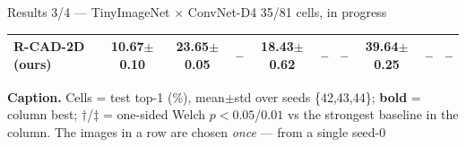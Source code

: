 \documentclass[aspectratio=169]{beamer}
\begin{document}
\begin{frame}{Results 3/4 --- TinyImageNet $\times$ ConvNet-D4 \hfill {\small 35/81 cells, in progress}}
\begin{center}
{\begin{tabular}{l ccc ccc ccc}
    \textbf{R-CAD-2D (ours)} & 10.67{\scriptsize$\pm$0.10} & 23.65{\scriptsize$\pm$0.05} & -- & \textbf{18.43{\scriptsize$\pm$0.62}} & -- & -- & 39.64{\scriptsize$\pm$0.25} & -- & -- \\
    \bottomrule
    \end{tabular}}
    \end{center}
    \vspace{-0.05cm}
{\tiny \textbf{Caption.} Cells = test top-1 (\%), mean$\pm$std over seeds
\{42,43,44\}; \textbf{bold} = column best; $\dagger$/$\ddagger$ = one-sided Welch $p{<}0.05$/$0.01$ vs
the strongest baseline in the column. The images in a row are chosen \emph{once} --- from a single seed-0}
\end{frame}

\end{document}

